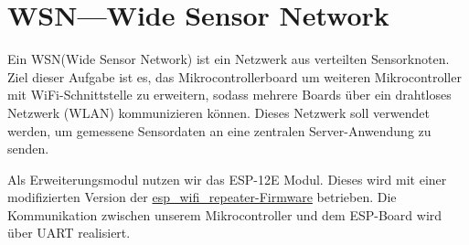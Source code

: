 \clearpage



\section{\ExercisePrefixEmbeddedC WSN---Wide Sensor Network\optional}
\newcommand{\toolWSN}{\textsc{WSN}\xspace}

\optionaltextboxC

Ein \toolWSN (Wide Sensor Network) ist ein Netzwerk aus verteilten Sensorknoten. Ziel dieser Aufgabe ist es, das Mikrocontrollerboard um weiteren Mikrocontroller mit WiFi-Schnittstelle zu erweitern, sodass mehrere Boards über ein drahtloses Netzwerk (WLAN) kommunizieren können. Dieses Netzwerk soll verwendet werden, um gemessene Sensordaten an eine zentralen Server-Anwendung zu senden.

Als Erweiterungsmodul nutzen wir das ESP-12E Modul. Dieses wird mit einer modifizierten Version der \href{https://github.com/martin-ger/esp_wifi_repeater}{esp\_wifi\_repeater-Firmware} betrieben. Die Kommunikation zwischen unserem Mikrocontroller und dem ESP-Board wird über UART realisiert. 


